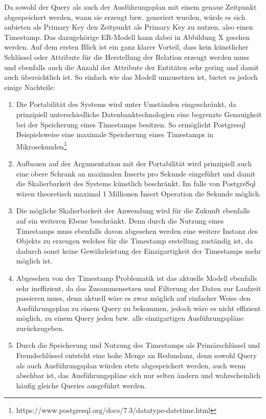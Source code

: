 Da sowohl der Query als auch der Ausführungsplan mit einem genaue Zeitpunkt abgespeichert werden, wann sie erzeugt bzw. generiert wurden, würde es sich anbieten als Primary Key den 
Zeitpunkt als Primary Key zu nutzen, also einen Timestamp. Das dazugehörige ER-Modell kann dabei in Abbildung X gesehen werden. Auf dem ersten Blick ist ein ganz klarer Vorteil, dass kein künstlicher Schlüssel oder Attribute für die Herstellung der Relation erzeugt werden muss und ebenfalls auch die Anzahl der Attribute der Entitäten sehr gering und damit auch übersichtlich ist.
So einfach wie das Modell umzusetzen ist, bietet es jedoch einige Nachteile:
\begin{enumerate}
	\item Die Portabilität des Systems wird unter Umständen eingeschränkt, da prinzipiell unterschiedliche Datenbanktechnologien eine begrenzte Genauigkeit bei der Speicherung eines Timestamps besitzen. So ermöglicht Postgresql Beispielsweise eine maximale Speicherung eines Timestamps in Mikrosekunden\footnote{https://www.postgresql.org/docs/7.3/datatype-datetime.html}
	\item Aufbauen auf der Argumentation mit der Portabilität wird prinzipiell auch eine obere Schrank an maximalen Inserts pro Sekunde eingeführt und damit die Skalierbarkeit des Systems künstlich beschränkt. Im falle von PostgreSql wären theoretisch maximal 1 Millionen Insert Operation die Sekunde möglich.
	\item Die mögliche Skalierbarkeit der Anwendung wird für die Zukunft ebenfalls auf ein weiteren Ebene beschränkt. Denn durch die Nutzung eines Timestamps muss ebenfalls davon abgesehen werden eine weitere Instanz des Objekts zu erzeugen welches für die Timestamp erstellung zuständig ist, da dadurch sonst keine Gewährleistung der Einzigartigkeit der Timestamps mehr möglich ist.
	\item Abgesehen von der Timestamp Problematik ist das aktuelle Modell ebenfalls sehr ineffizient, da das Zusammensetzen und Filterung der Daten zur Laufzeit passieren muss, denn aktuell wäre es zwar möglich auf einfacher Weise den Ausführungsplan zu einem Query zu bekommen, jedoch wäre es nicht effizient möglich, zu einem Query jeden bzw. alle einzigartigen Ausführungspläne zurückzugeben.
	\item Durch die Speicherung und Nutzung des Timestamps als Primärschlüssel und Fremdschlüssel entsteht eine hohe Menge an Redundanz, denn sowohl Query als auch Ausführungsplan würden stets abgespeichert werden, auch wenn absehbar ist, das Ausführungspläne sich nur selten ändern und wahrscheinlich häufig gleiche Queries ausgeführt werden. 
\end{enumerate}

